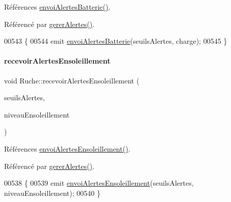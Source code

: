 Références \hyperlink{class_ruche_ac76ce5692e134b365330d91af2a6b4e7}{envoi\+Alertes\+Batterie()}.



Référencé par \hyperlink{class_ruche_a80f3538f081aea887d7199f114dfca01}{gerer\+Alertes()}.


\begin{DoxyCode}
00543 \{
00544     emit \hyperlink{class_ruche_ac76ce5692e134b365330d91af2a6b4e7}{envoiAlertesBatterie}(seuilsAlertes, charge);
00545 \}
\end{DoxyCode}
\mbox{\label{class_ruche_afdfb0cff676b6de5f421aed01c3d49db}} 
\paragraph{\texorpdfstring{recevoir\+Alertes\+Ensoleillement}{recevoirAlertesEnsoleillement}}
{\footnotesize\ttfamily void Ruche\+::recevoir\+Alertes\+Ensoleillement (\begin{DoxyParamCaption}\item[{\hyperlink{parametres_8h_aaa6de8207c94675264c90b10b613368d}{Seuils\+Alertes}}]{seuils\+Alertes,  }\item[{double}]{niveau\+Ensoleillement }\end{DoxyParamCaption})\hspace{0.3cm}{\ttfamily [slot]}}



Références \hyperlink{class_ruche_aa3d500a4a0e5ed60da000af15000505e}{envoi\+Alertes\+Ensoleillement()}.



Référencé par \hyperlink{class_ruche_a80f3538f081aea887d7199f114dfca01}{gerer\+Alertes()}.


\begin{DoxyCode}
00538 \{
00539     emit \hyperlink{class_ruche_aa3d500a4a0e5ed60da000af15000505e}{envoiAlertesEnsoleillement}(seuilsAlertes, niveauEnsoleillement);
00540 \}
\end{DoxyCode}
\mbox{\label{class_ruche_a6b12ebe7e83f12b31e49b44e25fdfa58}} 
